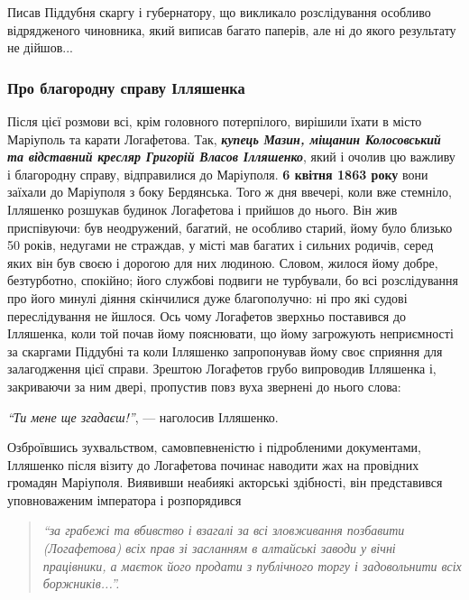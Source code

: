 Писав Піддубня скаргу і губернатору, що викликало розслідування особливо
відрядженого чиновника, який виписав багато паперів, але ні до якого результату
не дійшов...

\subsubsection{Про благородну справу Ілляшенка}

Після цієї розмови всі, крім головного потерпілого, вирішили їхати в місто
Маріуполь та карати Логафетова. Так, \emph{\textbf{купець Мазин, міщанин Колосовський та
відставний кресляр Григорій Власов Ілляшенко}}, який і очолив цю важливу і
благородну справу, відправилися до Маріуполя. \textbf{6 квітня 1863 року} вони заїхали
до Маріуполя з боку Бердянська. Того ж дня ввечері, коли вже стемніло,
Ілляшенко розшукав будинок Логафетова і прийшов до нього. Він жив приспівуючи:
був неодружений, багатий, не особливо старий, йому було близько 50 років,
недугами не страждав, у місті мав багатих і сильних родичів, серед яких він був
своєю і дорогою для них людиною. Словом, жилося йому добре, безтурботно,
спокійно; його службові подвиги не турбували, бо всі розслідування про його
минулі діяння скінчилися дуже благополучно: ні про які судові переслідування не
йшлося. Ось чому Логафетов зверхньо поставився до Ілляшенка, коли той почав
йому пояснювати, що йому загрожують неприємності за скаргами Піддубні та коли
Ілляшенко запропонував йому своє сприяння для залагодження цієї справи. Зрештою
Логафетов грубо випроводив Ілляшенка і, закриваючи за ним двері, пропустив повз
вуха звернені до нього слова:

\begin{leftbar}
\emph{\enquote{Ти мене ще згадаєш!}}, — наголосив Ілляшенко.
\end{leftbar}


Озброївшись зухвальством, самовпевненістю і підробленими документами, Ілляшенко
після візиту до Логафетова починає наводити жах на провідних громадян
Маріуполя. Виявивши неабиякі акторські здібності, він представився
уповноваженим імператора і розпорядився 

\begin{quote}
\em\enquote{за грабежі та вбивство і взагалі за
всі зловживання позбавити (Логафетова) всіх прав зі засланням в алтайські
заводи у вічні працівники, а маєток його продати з публічного торгу і
задовольнити всіх боржників...}. 
\end{quote}

